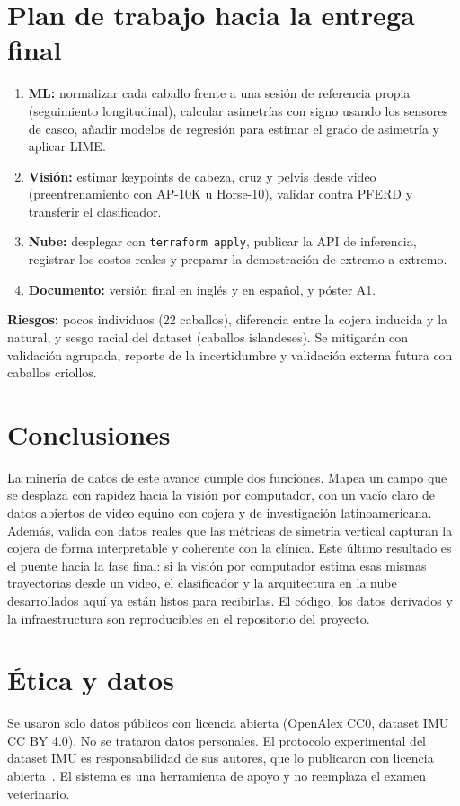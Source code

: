 \documentclass[conference,a4paper]{IEEEtran}
\begin{document}
\section{Plan de trabajo hacia la entrega final}
\begin{enumerate}
\item \textbf{ML:} normalizar cada caballo frente a una sesión de referencia propia (seguimiento longitudinal), calcular asimetrías con signo usando los sensores de casco, añadir modelos de regresión para estimar el grado de asimetría y aplicar LIME.
\item \textbf{Visión:} estimar keypoints de cabeza, cruz y pelvis desde video (preentrenamiento con AP-10K u Horse-10), validar contra PFERD y transferir el clasificador.
\item \textbf{Nube:} desplegar con \texttt{terraform apply}, publicar la API de inferencia, registrar los costos reales y preparar la demostración de extremo a extremo.
\item \textbf{Documento:} versión final en inglés y en español, y póster A1.
\end{enumerate}
\textbf{Riesgos:} pocos individuos (22 caballos), diferencia entre la cojera inducida y la natural, y sesgo racial del dataset (caballos islandeses). Se mitigarán con validación agrupada, reporte de la incertidumbre y validación externa futura con caballos criollos.

\section{Conclusiones}
La minería de datos de este avance cumple dos funciones. Mapea un campo que se desplaza con rapidez hacia la visión por computador, con un vacío claro de datos abiertos de video equino con cojera y de investigación latinoamericana. Además, valida con datos reales que las métricas de simetría vertical capturan la cojera de forma interpretable y coherente con la clínica. Este último resultado es el puente hacia la fase final: si la visión por computador estima esas mismas trayectorias desde un video, el clasificador y la arquitectura en la nube desarrollados aquí ya están listos para recibirlas. El código, los datos derivados y la infraestructura son reproducibles en el repositorio del proyecto.

\section*{Ética y datos}
Se usaron solo datos públicos con licencia abierta (OpenAlex CC0, dataset IMU CC BY 4.0). No se trataron datos personales. El protocolo experimental del dataset IMU es responsabilidad de sus autores, que lo publicaron con licencia abierta~\cite{smit2023dataset}. El sistema es una herramienta de apoyo y no reemplaza el examen veterinario.
\end{document}
